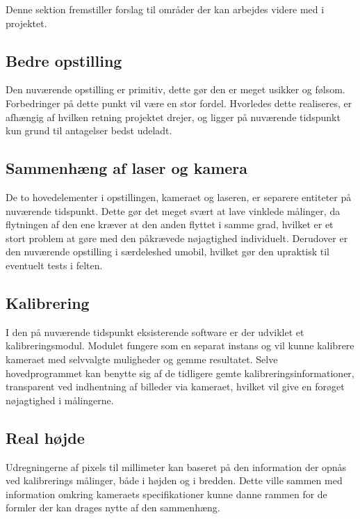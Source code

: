 Denne sektion fremstiller forslag til områder der kan arbejdes videre med i projektet.

\subsection{Bedre opstilling}

Den nuværende opstilling er primitiv, dette gør den er meget usikker og følsom. Forbedringer på dette punkt vil være en stor fordel. Hvorledes dette realiseres, er afhængig af hvilken retning projektet drejer, og ligger på nuværende tidspunkt kun grund til antagelser bedst udeladt.

\subsection{Sammenhæng af laser og kamera}

De to hovedelementer i opstillingen, kameraet og laseren, er separere entiteter på nuværende tidspunkt. Dette gør det meget svært at lave vinklede målinger, da flytningen af den ene kræver at den anden flyttet i samme grad, hvilket er et stort problem at gøre med den påkrævede nøjagtighed individuelt. Derudover er den nuværende opstilling i særdeleshed umobil, hvilket gør den upraktisk til eventuelt tests i felten.

\subsection{Kalibrering}

I den på nuværende tidspunkt eksisterende software er der udviklet et kalibreringsmodul. Modulet fungere som en separat instans og vil kunne kalibrere kameraet med selvvalgte muligheder og gemme resultatet.
Selve hovedprogrammet kan benytte sig af de tidligere gemte kalibreringsinformationer, transparent ved indhentning af billeder via kameraet, hvilket vil give en forøget nøjagtighed i målingerne.

\subsection{Real højde}

Udregningerne af pixels til millimeter kan baseret på den information der opnås ved kalibrerings målinger, både i højden og i bredden. Dette ville sammen med information omkring kameraets specifikationer kunne danne rammen for de formler der kan drages nytte af den sammenhæng.
